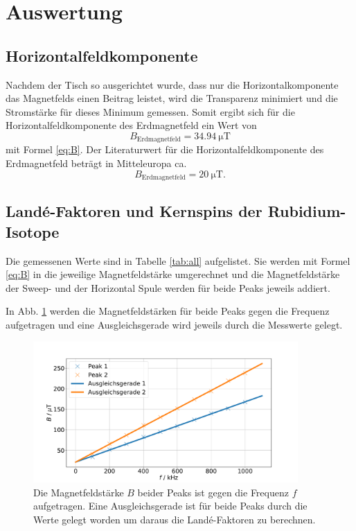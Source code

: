 \section{Auswertung}
\label{sec:Auswertung}

\subsection{Horizontalfeldkomponente}

Nachdem der Tisch so ausgerichtet wurde, dass nur die Horizontalkomponente das Magnetfelds einen Beitrag leistet, wird die Transparenz minimiert und die Stromstärke für dieses Minimum gemessen.
Somit ergibt sich für die Horizontalfeldkomponente des Erdmagnetfeld ein Wert von 
\begin{equation*}
    B_\text{Erdmagnetfeld} = \SI{34.94}{\micro\tesla}
\end{equation*}
mit Formel \ref{eq:B}.
Der Literaturwert für die Horizontalfeldkomponente des Erdmagnetfeld beträgt in Mitteleuropa ca. 
\begin{equation*}
    B_\text{Erdmagnetfeld} = \SI{20}{\micro\tesla}.
\end{equation*}

\subsection{Landé-Faktoren und Kernspins der Rubidium-Isotope} 

Die gemessenen Werte sind in Tabelle \ref{tab:all}
aufgelistet. Sie werden mit Formel \eqref{eq:B} in die jeweilige Magnetfeldstärke umgerechnet und die Magnetfeldstärke der Sweep- und der Horizontal Spule werden für beide Peaks jeweils addiert.

In Abb. \ref{fig:plot} werden die Magnetfeldstärken für beide Peaks gegen die Frequenz aufgetragen und eine Ausgleichsgerade wird jeweils durch die Messwerte gelegt. 
\begin{figure}
    \centering
    \includegraphics[width=0.9\textwidth]{plots/fits.pdf}
    \caption{Die Magnetfeldstärke $B$ beider Peaks ist gegen die Frequenz $f$ aufgetragen. Eine Ausgleichsgerade ist für beide Peaks durch die Werte gelegt worden um daraus die Landé-Faktoren zu berechnen.}
    \label{fig:plot}
\end{figure}

